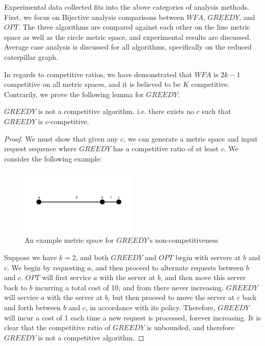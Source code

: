 Experimental data collected fits into the above categories of analysis methods. First, we focus on Bijective analysis comparisons between $WFA$, $GREEDY$, and $OPT$. The three algorithms are compared against each other on the line metric space as well as the circle metric space, and experimental results are discussed. Average case analysis is discussed for all algorithms, specifically on the reduced caterpillar graph. 

In regards to competitive ratios, we have demonstrated that $WFA$ is $2k-1$ competitive on all metric spaces, and it is believed to be $K$ competitive. Contrarily, we prove the following lemma for $GREEDY$:

\begin{lemma}
    $GREEDY$ is not a competitive algorithm. i.e. there exists no $c$ such that $GREEDY$ is $c$-competitive.
\end{lemma}

\begin{proof}
    We must show that given any $c$, we can generate a metric space and input request sequence where $GREEDY$ has a competitive ratio of at least $c$. We consider the following example:
    \begin{figure}[H]
        \centering
        \includegraphics[width=0.5\textwidth]{images/line.png}
        \caption{An example metric space for $GREEDY$'s non-competitiveness}
    \end{figure}
    Suppose we have $k = 2$, and both $GREEDY$ and $OPT$ begin with servers at $b$ and $c$. We begin by requesting $a$, and then proceed to alternate requests between $b$ and $c$. $OPT$ will first service $a$ with the server at $b$, and then move this server back to $b$ incurring a total cost of 10, and from there never increasing. $GREEDY$ will service $a$ with the server at $b$, but then proceed to move the server at $c$ back and forth between $b$ and $c$, in accordance with its policy. Therefore, $GREEDY$ will incur a cost of 1 each time a new request is processed, forever increasing. It is clear that the competitive ratio of $GREEDY$ is unbounded, and therefore $GREEDY$ is not a competitive algorithm.
\end{proof}

